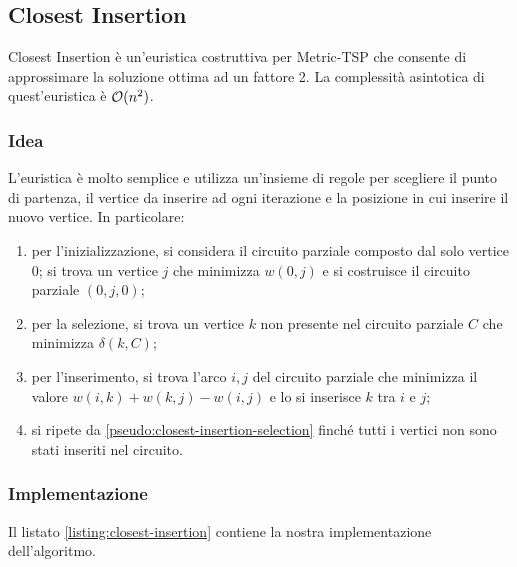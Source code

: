 
\subsection{Closest Insertion}
\label{sec:closest-insertion}

Closest Insertion è un'euristica costruttiva per Metric-TSP che
consente di approssimare la soluzione ottima ad un fattore
2. La complessità asintotica di quest'euristica è
$\mathcal{O}(n^2)$.

\subsubsection{Idea}

L'euristica è molto semplice e utilizza un'insieme di regole per
scegliere il punto di partenza, il vertice da inserire ad ogni
iterazione e la posizione in cui inserire il nuovo vertice. In
particolare:

\begin{enumerate}
    \item per l'inizializzazione, si considera il circuito parziale composto
      dal solo vertice $0$; si trova un vertice $j$ che minimizza $w(0,
      j)$ e si costruisce il circuito parziale $(0, j,0)$;
    \item per la selezione, si trova un vertice $k$ non presente nel circuito
      parziale $C$ che minimizza $\delta(k,C)$;
    \label{pseudo:closest-insertion-selection}
    \item per l'inserimento, si trova l’arco ${i, j}$ del circuito parziale che
      minimizza il valore $w(i, k) + w(k, j) - w(i, j)$ e lo si inserisce
      $k$ tra $i$ e $j$;
    \item si ripete da \ref{pseudo:closest-insertion-selection} finché
tutti i vertici non sono stati inseriti nel circuito.
\end{enumerate}

\subsubsection{Implementazione}

\noindent Il listato \ref{listing:closest-insertion} contiene la
nostra implementazione dell'algoritmo.

